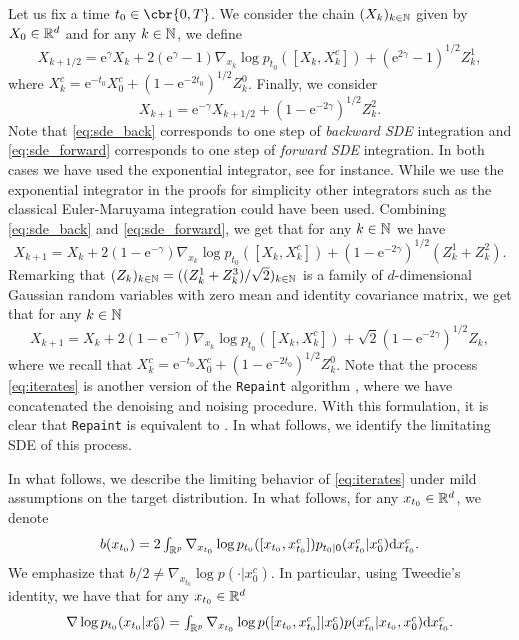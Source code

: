 Let us fix a time $t_0 \in \cbr{0,T}$.
We consider the chain $(X_k)_{k \in \mathbb{N}}$ given by $X_0 \in \mathbb{R}^d$ and for any $k \in \mathbb{N}$, we define \begin{equation} \label{eq:sde_back} X_{k+1/2} = \mathrm{e}^{\gamma} X_k + 2 (\mathrm{e}^\gamma - 1) \nabla_{x_k} \log p_{t_0}([X_k, X_k^c]) + (\mathrm{e}^{2\gamma}-1)^{1/2} Z^1_k , \end{equation} where $X_k^c = \mathrm{e}^{-t_0} X_0^c + (1-\mathrm{e}^{-2t_0})^{1/2} Z_k^0$.
Finally, we consider \begin{equation} \label{eq:sde_forward} X_{k+1} = \mathrm{e}^{-\gamma} X_{k+1/2} + (1 - \mathrm{e}^{-2\gamma})^{1/2} Z_k^2.
\end{equation}
Note that \eqref{eq:sde_back} corresponds to one step of \emph{backward SDE} integration and \eqref{eq:sde_forward} corresponds to one step of \emph{forward SDE} integration.
In both cases we have used the exponential integrator, see \cite{de2022convergence} for instance.
While we use the exponential integrator in the proofs for simplicity other integrators such as the classical Euler-Maruyama integration could have been used.
Combining \eqref{eq:sde_back} and \eqref{eq:sde_forward}, we get that for any $k \in \mathbb{N}$ we have \begin{equation} X_{k+1} = X_k + 2 (1 -\mathrm{e}^{-\gamma}) \nabla_{x_k} \log p_{t_0}([X_k, X_k^c]) + (1 - \mathrm{e}^{-2\gamma})^{1/2} (Z_k^1 + Z_k^2) .
\end{equation}
Remarking that $(Z_k)_{k \in \mathbb{N}} = ((Z_k^1 + Z_k^3)/\sqrt{2})_{k \in \mathbb{N}}$ is a family of $d$-dimensional Gaussian random variables with zero mean and identity covariance matrix, we get that for any $k \in \mathbb{N}$ \begin{equation} \label{eq:iterates} X_{k+1} = X_k + 2 (1 -\mathrm{e}^{-\gamma}) \nabla_{x_k} \log p_{t_0}([X_k, X_k^c]) + \sqrt{2} (1 - \mathrm{e}^{-2\gamma})^{1/2} Z_k , \end{equation} where we recall that $X_k^c = \mathrm{e}^{-t_0} X_0^c + (1-\mathrm{e}^{-2t_0})^{1/2} Z_k^0$.
Note that the process \eqref{eq:iterates} is another version of the \texttt{Repaint} algorithm \cite{lugmayr2022repaint}, where we have concatenated the denoising and noising procedure.
With this formulation, it is clear that \texttt{Repaint} is equivalent to .
In what follows, we identify the limitating SDE of this process.

In what follows, we describe the limiting behavior of \eqref{eq:iterates} under mild assumptions on the target distribution.
In what follows, for any $x_{t_0} \in \mathbb{R}^d$, we denote \begin{equation} \textstyle b(x_{t_0}) = 2\int_{\mathbb{R}^p} \nabla_{x_{t_0}} \log p_{t_0}([x_{t_0}, x_{t_0}^c]) p_{t_0|0}(x_{t_0}^c|x_0^c) \mathrm{d} x_{t_0}^c .
\end{equation}
We emphasize that $b/2 \neq \nabla_{x_{t_0}} \log p(\cdot | x_0^c)$.
In particular, using Tweedie's identity, we have that for any $x_{t_0} \in \mathbb{R}^d$ \begin{equation} \textstyle \nabla \log p_{t_0}(x_{t_0}|x_0^c) = \int_{\mathbb{R}^p} \nabla_{x_{t_0}} \log p([x_{t_0}, x_{t_0}^c] | x_0^c) p(x_{t_0}^c|x_{t_0},x_0^c) \mathrm{d} x_{t_0}^c .
\end{equation}

